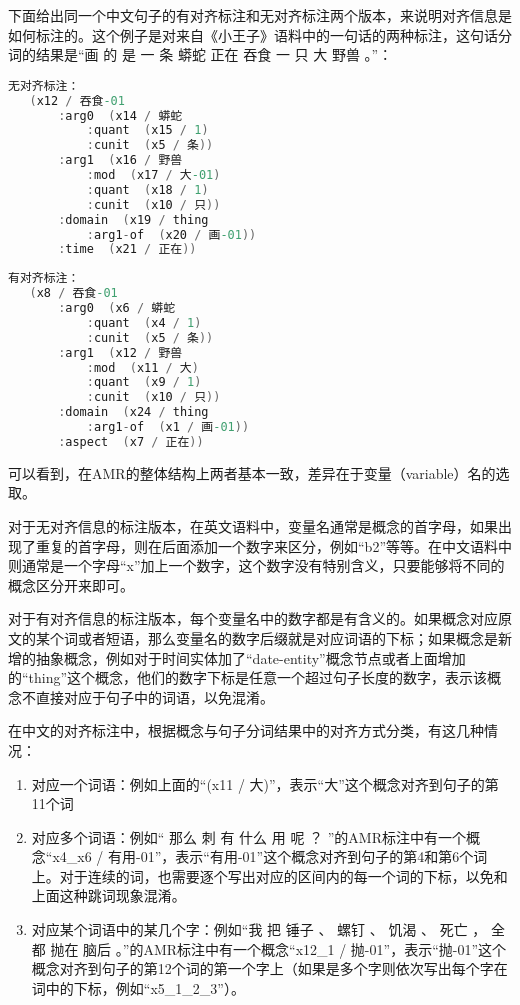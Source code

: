 \documentclass[master, winfont]{njuthesis}
\begin{document}
下面给出同一个中文句子的有对齐标注和无对齐标注两个版本，来说明对齐信息是如何标注的。这个例子是对来自《小王子》语料中的一句话的两种标注，这句话分词的结果是“画 的 是 一 条 蟒蛇 正在 吞食 一 只 大 野兽 。”：

\begin{lstlisting}[language=C]
无对齐标注：
   (x12 / 吞食-01
       :arg0  (x14 / 蟒蛇
           :quant  (x15 / 1)
           :cunit  (x5 / 条))
       :arg1  (x16 / 野兽
           :mod  (x17 / 大-01)
           :quant  (x18 / 1)
           :cunit  (x10 / 只))
       :domain  (x19 / thing
           :arg1-of  (x20 / 画-01))
       :time  (x21 / 正在))
\end{lstlisting}

\begin{lstlisting}[language=C]
有对齐标注：
   (x8 / 吞食-01
       :arg0  (x6 / 蟒蛇
           :quant  (x4 / 1)
           :cunit  (x5 / 条))
       :arg1  (x12 / 野兽
           :mod  (x11 / 大)
           :quant  (x9 / 1)
           :cunit  (x10 / 只))
       :domain  (x24 / thing
           :arg1-of  (x1 / 画-01))
       :aspect  (x7 / 正在))
\end{lstlisting}

可以看到，在AMR的整体结构上两者基本一致，差异在于变量（variable）名的选取。

对于无对齐信息的标注版本，在英文语料中，变量名通常是概念的首字母，如果出现了重复的首字母，则在后面添加一个数字来区分，例如“b2”等等。在中文语料中则通常是一个字母“x”加上一个数字，这个数字没有特别含义，只要能够将不同的概念区分开来即可。

对于有对齐信息的标注版本，每个变量名中的数字都是有含义的。如果概念对应原文的某个词或者短语，那么变量名的数字后缀就是对应词语的下标；如果概念是新增的抽象概念，例如对于时间实体加了“date-entity”概念节点或者上面增加的“thing”这个概念，他们的数字下标是任意一个超过句子长度的数字，表示该概念不直接对应于句子中的词语，以免混淆。

在中文的对齐标注中，根据概念与句子分词结果中的对齐方式分类，有这几种情况：
\begin{enumerate}
	\item 对应一个词语：例如上面的“(x11 / 大)”，表示“大”这个概念对齐到句子的第11个词
	\item 对应多个词语：例如“ 那么 刺 有 什么 用 呢 ？ ”的AMR标注中有一个概念“x4\_x6 / 有用-01”，表示“有用-01”这个概念对齐到句子的第4和第6个词上。对于连续的词，也需要逐个写出对应的区间内的每一个词的下标，以免和上面这种跳词现象混淆。
	\item 对应某个词语中的某几个字：例如“我 把 锤子 、 螺钉 、 饥渴 、 死亡 ， 全都 抛在 脑后 。”的AMR标注中有一个概念“x12\_1 / 抛-01”，表示“抛-01”这个概念对齐到句子的第12个词的第一个字上（如果是多个字则依次写出每个字在词中的下标，例如“x5\_1\_2\_3”）。
\end{enumerate}
\end{document}
